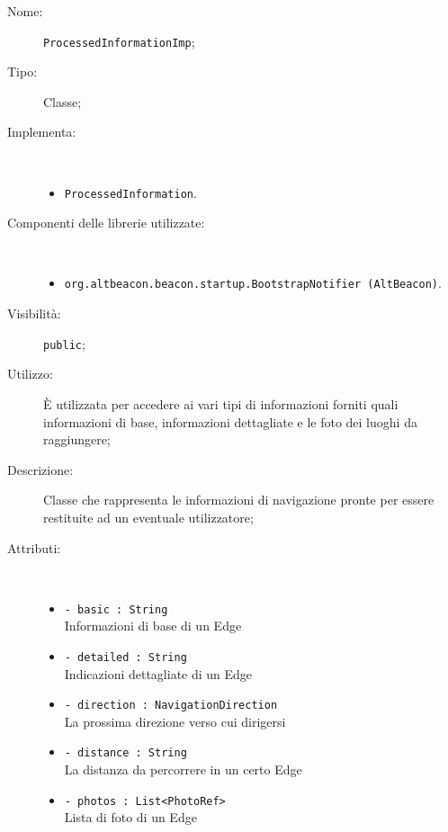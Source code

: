 \documentclass[../DefinizioneDiProdotto.tex]{subfiles}
\begin{document}
\begin{description}
	\item[Nome:] \texttt{ProcessedInformationImp};
	\item[Tipo:] Classe;
	\item[Implementa:] \
	\begin{itemize}
		\item \texttt{ProcessedInformation}.
		
	\end{itemize}
	\item[Componenti delle librerie utilizzate:] \
	\begin{itemize}
		\item \texttt{org.altbeacon.beacon.startup.BootstrapNotifier (AltBeacon)}.
		
	\end{itemize}
	\item[Visibilità:] \texttt{public};
	\item[Utilizzo:] È utilizzata per accedere ai vari tipi di informazioni forniti quali informazioni di base, informazioni dettagliate e le foto dei luoghi da raggiungere;
	\item[Descrizione:] Classe che rappresenta le informazioni di navigazione pronte per essere restituite ad un eventuale utilizzatore;
	\item[Attributi:] \
	\begin{itemize}
		\item \texttt{- basic : String}\\
		Informazioni di base di un Edge
		
		\item \texttt{- detailed : String}\\
		Indicazioni dettagliate di un Edge
		
		\item \texttt{- direction : NavigationDirection}\\
		La prossima direzione verso cui dirigersi
		
		\item \texttt{- distance : String}\\
		La distanza da percorrere in un certo Edge
		
		\item \texttt{- photos : List<PhotoRef>}\\
		Lista di foto di un Edge
		

\end{itemize}
\end{description}
\end{document}
